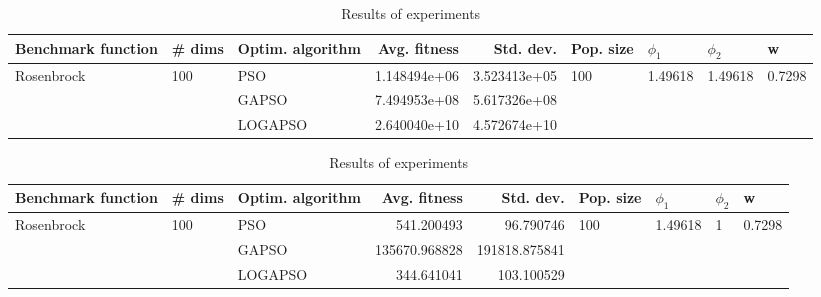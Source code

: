 \documentclass{article}
\begin{document}
\begin{table}
\centering
\caption{Results of experiments}
\begin{tabular}{lllrrllll}
\toprule
         Benchmark function &              \# dims & Optim. algorithm &  Avg. fitness &    Std. dev. &            Pop. size &               $\phi_{1}$ &               $\phi_{2}$ &                       w \\
\midrule
\multirow{3}{*}{Rosenbrock} & \multirow{3}{*}{100} &              PSO &  1.148494e+06 & 3.523413e+05 & \multirow{3}{*}{100} & \multirow{3}{*}{1.49618} & \multirow{3}{*}{1.49618} & \multirow{3}{*}{0.7298} \\
                            &                      &            GAPSO &  7.494953e+08 & 5.617326e+08 &                      &                          &                          &                         \\
                            &                      &          LOGAPSO &  2.640040e+10 & 4.572674e+10 &                      &                          &                          &                         \\
\bottomrule
\end{tabular}
\end{table}
\begin{table}
\centering
\caption{Results of experiments}
\begin{tabular}{lllrrllll}
\toprule
         Benchmark function &              \# dims & Optim. algorithm &  Avg. fitness &     Std. dev. &            Pop. size &               $\phi_{1}$ &         $\phi_{2}$ &                       w \\
\midrule
\multirow{3}{*}{Rosenbrock} & \multirow{3}{*}{100} &              PSO &    541.200493 &     96.790746 & \multirow{3}{*}{100} & \multirow{3}{*}{1.49618} & \multirow{3}{*}{1} & \multirow{3}{*}{0.7298} \\
                            &                      &            GAPSO & 135670.968828 & 191818.875841 &                      &                          &                    &                         \\
                            &                      &          LOGAPSO &    344.641041 &    103.100529 &                      &                          &                    &                         \\
\bottomrule
\end{tabular}
\end{table}
\end{document}
